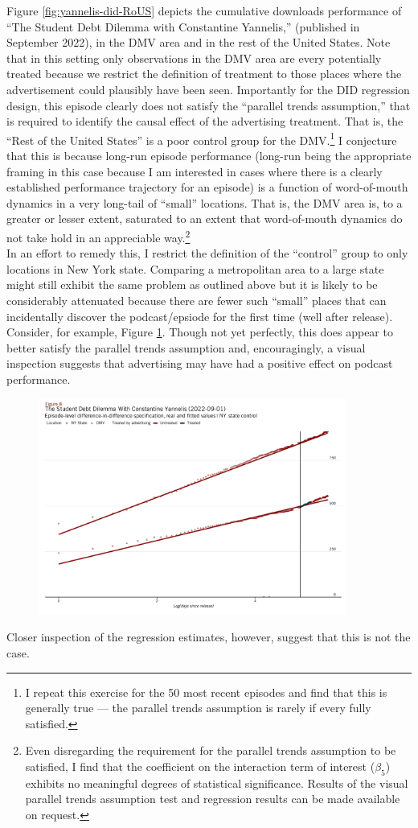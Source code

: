 \documentclass[11pt, letterpaper, twoside]{article}
\begin{document}
Figure \ref{fig:yannelis-did-RoUS} depicts the cumulative downloads performance of ``The Student Debt Dilemma with Constantine Yannelis,'' (published in September 2022), in the DMV area and in the rest of the United States. Note that in this setting only observations in the DMV area are every potentially treated because we restrict the definition of treatment to those places where the advertisement could plausibly have been seen. Importantly for the DID regression design, this episode clearly does not satisfy the ``parallel trends assumption,'' that is required to identify the causal effect of the advertising treatment. That is, the ``Rest of the United States'' is a poor control group for the DMV.\footnote{I repeat this exercise for the 50 most recent episodes and find that this is generally true --- the parallel trends assumption is rarely if every fully satisfied.} I conjecture that this is because long-run episode performance (long-run being the appropriate framing in this case because I am interested in cases where there is a clearly established performance trajectory for an episode) is a function of word-of-mouth dynamics in a very long-tail of ``small'' locations. That is, the DMV area is, to a greater or lesser extent, saturated to an extent that word-of-mouth dynamics do not take hold in an appreciable way.\footnote{Even disregarding the requirement for the parallel trends assumption to be satisfied, I find that the coefficient on the interaction term of interest ($\beta_5$) exhibits no meaningful degrees of statistical significance. Results of the visual parallel trends assumption test and regression results can be made available on request.}\\

In an effort to remedy this, I restrict the definition of the ``control'' group to only locations in New York state. Comparing a metropolitan area to a large state might still exhibit the same problem as outlined above but it is likely to be considerably attenuated because there are fewer such ``small'' places that can incidentally discover the podcast/epsiode for the first time (well after release). Consider, for example, Figure \ref{fig:yannelis-did-nys}. Though not yet perfectly, this does appear to better satisfy the parallel trends assumption and, encouragingly, a visual inspection suggests that advertising may have had a positive effect on podcast performance.\\

\begin{figure}[!htb]
  \centering
  \includegraphics[width=0.9\textwidth]{figures/yannelis_did_nys_plot.png}
  \caption{}
  \label{fig:yannelis-did-nys}
\end{figure}

Closer inspection of the regression estimates, however, suggest that this is not the case. 
\end{document}
